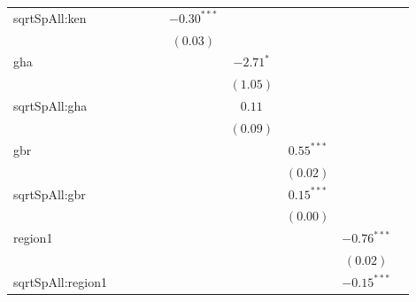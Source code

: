 \begin{sidewaystable}
\begin{center}
{\begin{tabular}{l c c c c c c c c c}
sqrtSpAll:ken     &               &               &               &               & $-0.30^{***}$ &               &               &               &               \\
                  &               &               &               &               & $(0.03)$      &               &               &               &               \\
gha               &               &               &               &               &               & $-2.71^{*}$   &               &               &               \\
                  &               &               &               &               &               & $(1.05)$      &               &               &               \\
sqrtSpAll:gha     &               &               &               &               &               & $0.11$        &               &               &               \\
                  &               &               &               &               &               & $(0.09)$      &               &               &               \\
gbr               &               &               &               &               &               &               & $0.55^{***}$  &               &               \\
                  &               &               &               &               &               &               & $(0.02)$      &               &               \\
sqrtSpAll:gbr     &               &               &               &               &               &               & $0.15^{***}$  &               &               \\
                  &               &               &               &               &               &               & $(0.00)$      &               &               \\
region1           &               &               &               &               &               &               &               & $-0.76^{***}$ &               \\
                  &               &               &               &               &               &               &               & $(0.02)$      &               \\
sqrtSpAll:region1 &               &               &               &               &               &               &               & $-0.15^{***}$ &               \\

\end{tabular}}
\end{center}
\end{sidewaystable}
